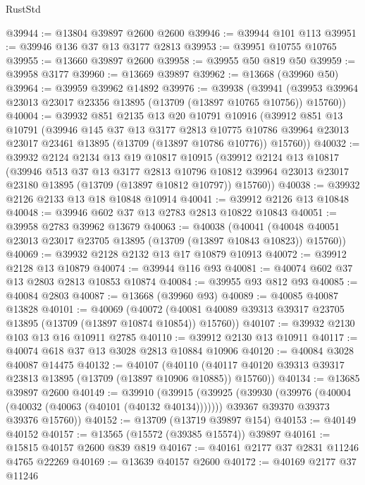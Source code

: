 \begin{lexlean}{RustStd}
\begin{coremodule}
@39944 := @13804 @39897 @2600 @2600
@39946 := @39944 @101 @113
@39951 := @39946 @136 @37 @13 @3177 @2813
@39953 := @39951 @10755 @10765
@39955 := @13660 @39897 @2600
@39958 := @39955 @50 @819 @50
@39959 := @39958 @3177
@39960 := @13669 @39897
@39962 := @13668 (@39960 @50)
@39964 := @39959 @39962 @14892
@39976 := @39938
    (@39941 (@39953 @39964 @23013 @23017 @23356 @13895 (@13709 (@13897 @10765 @10756)) @15760))
@40004 := @39932
    @851
    @2135
    @13
    @20
    @10791
    @10916
    (@39912
      @851
      @13
      @10791
      (@39946
        @145
        @37
        @13
        @3177
        @2813
        @10775
        @10786
        @39964
        @23013
        @23017
        @23461
        @13895
        (@13709 (@13897 @10786 @10776))
        @15760))
@40032 := @39932
    @2124
    @2134
    @13
    @19
    @10817
    @10915
    (@39912
      @2124
      @13
      @10817
      (@39946
        @513
        @37
        @13
        @3177
        @2813
        @10796
        @10812
        @39964
        @23013
        @23017
        @23180
        @13895
        (@13709 (@13897 @10812 @10797))
        @15760))
@40038 := @39932 @2126 @2133 @13 @18 @10848 @10914
@40041 := @39912 @2126 @13 @10848
@40048 := @39946 @602 @37 @13 @2783 @2813 @10822 @10843
@40051 := @39958 @2783 @39962 @13679
@40063 := @40038
    (@40041 (@40048 @40051 @23013 @23017 @23705 @13895 (@13709 (@13897 @10843 @10823)) @15760))
@40069 := @39932 @2128 @2132 @13 @17 @10879 @10913
@40072 := @39912 @2128 @13 @10879
@40074 := @39944 @116 @93
@40081 := @40074 @602 @37 @13 @2803 @2813 @10853 @10874
@40084 := @39955 @93 @812 @93
@40085 := @40084 @2803
@40087 := @13668 (@39960 @93)
@40089 := @40085 @40087 @13828
@40101 := @40069
    (@40072 (@40081 @40089 @39313 @39317 @23705 @13895 (@13709 (@13897 @10874 @10854)) @15760))
@40107 := @39932 @2130 @103 @13 @16 @10911 @2785
@40110 := @39912 @2130 @13 @10911
@40117 := @40074 @618 @37 @13 @3028 @2813 @10884 @10906
@40120 := @40084 @3028 @40087 @14475
@40132 := @40107
    (@40110 (@40117 @40120 @39313 @39317 @23813 @13895 (@13709 (@13897 @10906 @10885)) @15760))
@40134 := @13685 @39897 @2600
@40149 := @39910
    (@39915
      (@39925
        (@39930 (@39976 (@40004 (@40032 (@40063 (@40101 (@40132 @40134)))))))
        @39367
        @39370
        @39373
        @39376
        @15760))
@40152 := @13709 (@13719 @39897 @154)
@40153 := @40149 @40152
@40157 := @13565 (@15572 (@39385 @15574)) @39897
@40161 := @15815 @40157 @2600 @839 @819
@40167 := @40161 @2177 @37 @2831 @11246 @4765 @22269
@40169 := @13639 @40157 @2600
@40172 := @40169 @2177 @37 @11246

\end{coremodule}
\end{lexlean}
